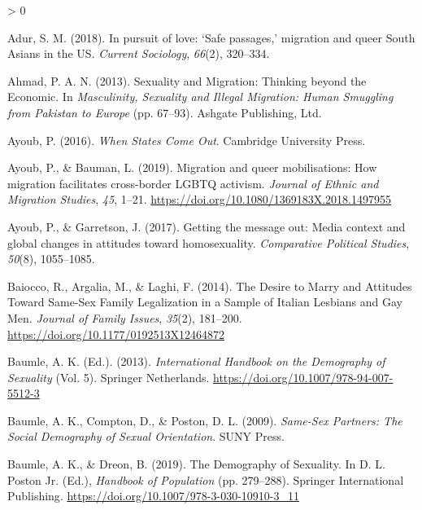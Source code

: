 \documentclass[
  11pt,
]{article}
\newlength{\cslhangindent}
\newenvironment{CSLReferences}[2] %
 {%
  \setlength{\parindent}{0pt}
  \ifodd #1 \everypar{\setlength{\hangindent}{\cslhangindent}}\ignorespaces\fi
  \ifnum #2 > 0
  \setlength{\parskip}{#2\baselineskip}
  \fi
 }%
 {}
\begin{document}
\noindent

\hypertarget{refs}{}
\begin{CSLReferences}{1}{0}
\leavevmode\hypertarget{ref-adur_2018}{}%
Adur, S. M. (2018). In pursuit of love: {`{Safe} passages,'} migration and queer {South Asians} in the {US}. \emph{Current Sociology}, \emph{66}(2), 320--334.

\leavevmode\hypertarget{ref-ahmad_2013}{}%
Ahmad, P. A. N. (2013). Sexuality and {Migration}: {Thinking} beyond the {Economic}. In \emph{Masculinity, {Sexuality} and {Illegal Migration}: {Human Smuggling} from {Pakistan} to {Europe}} (pp. 67--93). {Ashgate Publishing, Ltd.}

\leavevmode\hypertarget{ref-ayoub_2016}{}%
Ayoub, P. (2016). \emph{When {States Come Out}}. {Cambridge University Press}.

\leavevmode\hypertarget{ref-ayoub_2019_migration}{}%
Ayoub, P., \& Bauman, L. (2019). Migration and queer mobilisations: How migration facilitates cross-border {LGBTQ} activism. \emph{Journal of Ethnic and Migration Studies}, \emph{45}, 1--21. \url{https://doi.org/10.1080/1369183X.2018.1497955}

\leavevmode\hypertarget{ref-ayoub_2017}{}%
Ayoub, P., \& Garretson, J. (2017). Getting the message out: {Media} context and global changes in attitudes toward homosexuality. \emph{Comparative Political Studies}, \emph{50}(8), 1055--1085.

\leavevmode\hypertarget{ref-baiocco_2014_desire}{}%
Baiocco, R., Argalia, M., \& Laghi, F. (2014). The {Desire} to {Marry} and {Attitudes Toward Same}-{Sex Family Legalization} in a {Sample} of {Italian Lesbians} and {Gay Men}. \emph{Journal of Family Issues}, \emph{35}(2), 181--200. \url{https://doi.org/10.1177/0192513X12464872}

\leavevmode\hypertarget{ref-baumle_2013}{}%
Baumle, A. K. (Ed.). (2013). \emph{International {Handbook} on the {Demography} of {Sexuality}} (Vol. 5). {Springer Netherlands}. \url{https://doi.org/10.1007/978-94-007-5512-3}

\leavevmode\hypertarget{ref-baumle_2009}{}%
Baumle, A. K., Compton, D., \& Poston, D. L. (2009). \emph{Same-{Sex Partners}: {The Social Demography} of {Sexual Orientation}}. {SUNY Press}.

\leavevmode\hypertarget{ref-baumle_2019}{}%
Baumle, A. K., \& Dreon, B. (2019). The {Demography} of {Sexuality}. In D. L. Poston Jr. (Ed.), \emph{Handbook of {Population}} (pp. 279--288). {Springer International Publishing}. \url{https://doi.org/10.1007/978-3-030-10910-3_11}


\end{CSLReferences}
\end{document}
